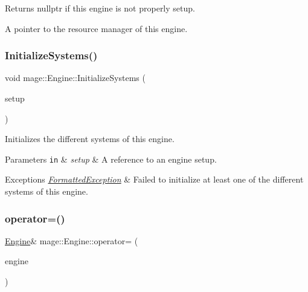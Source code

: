 \begin{DoxyReturn}{Returns}
{\ttfamily nullptr} if this engine is not properly setup. 

A pointer to the resource manager of this engine. 
\end{DoxyReturn}
\hypertarget{classmage_1_1_engine_a29a47448fb182b110d46d287a72b8b4e}{}\label{classmage_1_1_engine_a29a47448fb182b110d46d287a72b8b4e} 
\subsubsection{\texorpdfstring{Initialize\+Systems()}{InitializeSystems()}}
{\footnotesize\ttfamily void mage\+::\+Engine\+::\+Initialize\+Systems (\begin{DoxyParamCaption}\item[{const \hyperlink{structmage_1_1_engine_setup}{Engine\+Setup} \&}]{setup }\end{DoxyParamCaption})\hspace{0.3cm}{\ttfamily [private]}}

Initializes the different systems of this engine.


\begin{DoxyParams}[1]{Parameters}
\mbox{\tt in}  & {\em setup} & A reference to an engine setup. \\
\hline
\end{DoxyParams}

\begin{DoxyExceptions}{Exceptions}
{\em \hyperlink{structmage_1_1_formatted_exception}{Formatted\+Exception}} & Failed to initialize at least one of the different systems of this engine. \\
\hline
\end{DoxyExceptions}
\hypertarget{classmage_1_1_engine_a1eedff82d4c8207c61676230520648fd}{}\label{classmage_1_1_engine_a1eedff82d4c8207c61676230520648fd} 
\subsubsection{\texorpdfstring{operator=()}{operator=()}\hspace{0.1cm}{\footnotesize\ttfamily [1/2]}}
{\footnotesize\ttfamily \hyperlink{classmage_1_1_engine}{Engine}\& mage\+::\+Engine\+::operator= (\begin{DoxyParamCaption}\item[{const \hyperlink{classmage_1_1_engine}{Engine} \&}]{engine }\end{DoxyParamCaption})\hspace{0.3cm}{\ttfamily [delete]}}

